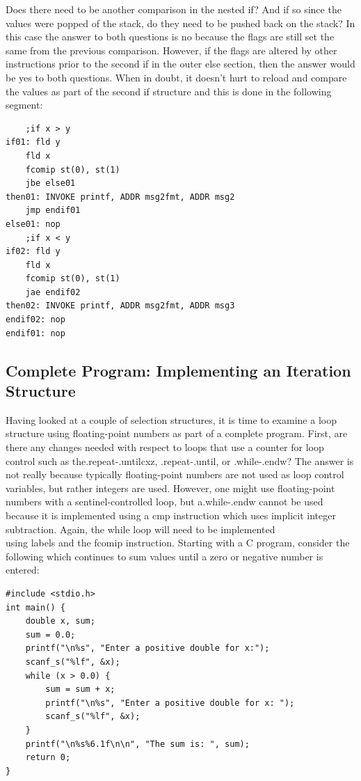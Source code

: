 \documentclass[10pt]{article}
\begin{document}
Does there need to be another comparison in the nested if? And if so since the values were popped of the stack, do they need to be pushed back on the stack? In this case the answer to both questions is no because the flags are still set the same from the previous comparison. However, if the flags are altered by other instructions prior to the second if in the outer else section, then the answer would be yes to both questions. When in doubt, it doesn't hurt to reload and compare the values as part of the second if structure and this is done in the following segment:

\begin{verbatim}
    ;if x > y
if01: fld y
    fld x
    fcomip st(0), st(1)
    jbe else01
then01: INVOKE printf, ADDR msg2fmt, ADDR msg2
    jmp endif01
else01: nop
    ;if x < y
if02: fld y
    fld x
    fcomip st(0), st(1)
    jae endif02
then02: INVOKE printf, ADDR msg2fmt, ADDR msg3
endif02: nop
endif01: nop
\end{verbatim}

\subsection*{Complete Program: Implementing an Iteration Structure}
Having looked at a couple of selection structures, it is time to examine a loop structure using floating-point numbers as part of a complete program. First, are there any changes needed with respect to loops that use a counter for loop control such as the.repeat-.untilcxz, .repeat-.until, or .while-.endw? The answer is not really because typically floating-point numbers are not used as loop control variables, but rather integers are used. However, one might use floating-point numbers with a sentinel-controlled loop, but a.while-.endw cannot be used because it is implemented using a cmp instruction which uses implicit integer subtraction. Again, the while loop will need to be implemented\\
using labels and the fcomip instruction. Starting with a C program, consider the following which continues to sum values until a zero or negative number is entered:

\begin{verbatim}
#include <stdio.h>
int main() {
    double x, sum;
    sum = 0.0;
    printf("\n%s", "Enter a positive double for x:");
    scanf_s("%lf", &x);
    while (x > 0.0) {
        sum = sum + x;
        printf("\n%s", "Enter a positive double for x: ");
        scanf_s("%lf", &x);
    }
    printf("\n%s%6.1f\n\n", "The sum is: ", sum);
    return 0;
}
\end{verbatim}
\end{document}
